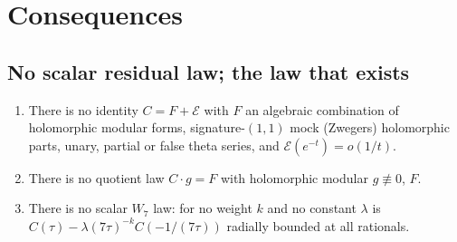 \section{Consequences}\label{sec:consequences}
\subsection{No scalar residual law; the law that exists}
\begin{proposition}\label{prop:noscalar8}
\begin{enumerate}[label=(\roman*)]
\item There is no identity $C=F+\mathcal E$ with $F$ an algebraic combination of holomorphic modular forms, signature-$(1,1)$ mock (Zwegers) holomorphic parts,
unary, partial or false theta series, and $\mathcal E(e^{-t})=o(1/t)$.
\item There is no quotient law $C\cdot g=F$ with holomorphic modular $g\not\equiv0$, $F$.
\item There is no scalar $W_7$ law: for no weight $k$ and no constant $\lambda$ is $C(\tau)-\lambda(7\tau)^{-k}C(-1/(7\tau))$ radially bounded at all rationals.
\end{enumerate}
\end{proposition}

